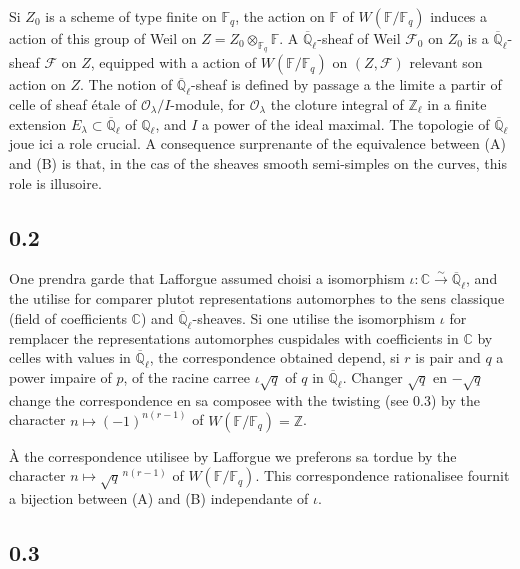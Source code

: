 \documentclass[11pt,a4paper]{article}
\theoremstyle{plain}
\theoremstyle{definition}
\begin{document}
Si $Z_0$ is a scheme of type finite on $\mathbb{F}_q$, the action on $\mathbb{F}$ of $W(\mathbb{F}/\mathbb{F}_q)$ induces a action of this group of Weil on $Z = Z_0 \otimes_{\mathbb{F}_q} \mathbb{F}$. A $\overline{\mathbb{Q}}_\ell$-sheaf of Weil $\mathcal{F}_0$ on $Z_0$ is a $\overline{\mathbb{Q}}_\ell$-sheaf $\mathcal{F}$ on $Z$, equipped with a action of $W(\mathbb{F}/\mathbb{F}_q)$ on $(Z,\mathcal{F})$ relevant son action on $Z$. The notion of $\overline{\mathbb{Q}}_\ell$-sheaf is defined by passage a the limite a partir of celle of sheaf étale of $\mathcal{O}_\lambda/I$-module, for $\mathcal{O}_\lambda$ the cloture integral of $\mathbb{Z}_\ell$ in a finite extension $E_\lambda \subset \overline{\mathbb{Q}}_\ell$ of $\mathbb{Q}_\ell$, and $I$ a power of the ideal maximal. The topologie of $\overline{\mathbb{Q}}_\ell$ joue ici a role crucial. A consequence surprenante of the equivalence between (A) and (B) is that, in the cas of the sheaves smooth semi-simples on the curves, this role is illusoire.

\subsection*{0.2}

One prendra garde that Lafforgue assumed choisi a isomorphism $\iota: \mathbb{C} \xrightarrow{\sim} \overline{\mathbb{Q}}_\ell$, and the utilise for comparer plutot representations automorphes to the sens classique (field of coefficients $\mathbb{C}$) and $\overline{\mathbb{Q}}_\ell$-sheaves. Si one utilise the isomorphism $\iota$ for remplacer the representations automorphes cuspidales with coefficients in $\mathbb{C}$ by celles with values in $\overline{\mathbb{Q}}_\ell$, the correspondence obtained depend, si $r$ is pair and $q$ a power impaire of $p$, of the racine carree $\iota\sqrt{q}$ of $q$ in $\overline{\mathbb{Q}}_\ell$. Changer $\sqrt{q}$ en $-\sqrt{q}$ change the correspondence en sa composee with the twisting (see 0.3) by the character $n \mapsto (-1)^{n(r-1)}$ of $W(\mathbb{F}/\mathbb{F}_q) = \mathbb{Z}$.

\`A the correspondence utilisee by Lafforgue we preferons sa tordue by the character $n \mapsto \sqrt{q}^{\,n(r-1)}$ of $W(\mathbb{F}/\mathbb{F}_q)$. This correspondence rationalisee fournit a bijection between (A) and (B) independante of $\iota$.

\subsection*{0.3}
\end{document}
